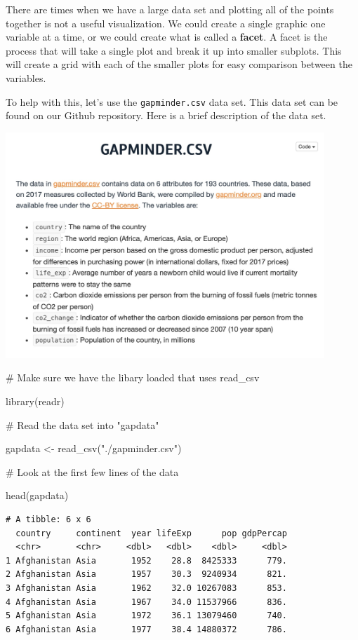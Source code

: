 \documentclass[
  letterpaper,
  DIV=11,
  numbers=noendperiod]{scrreprt}
\newenvironment{Shaded}{\begin{snugshade}}{\end{snugshade}}
\newcommand{\CommentTok}[1]{\textcolor[rgb]{0.37,0.37,0.37}{#1}}
\newcommand{\FunctionTok}[1]{\textcolor[rgb]{0.28,0.35,0.67}{#1}}
\newcommand{\NormalTok}[1]{\textcolor[rgb]{0.00,0.23,0.31}{#1}}
\newcommand{\OtherTok}[1]{\textcolor[rgb]{0.00,0.23,0.31}{#1}}
\newcommand{\StringTok}[1]{\textcolor[rgb]{0.13,0.47,0.30}{#1}}
\begin{document}
There are times when we have a large data set and plotting all of the
points together is not a useful visualization. We could create a single
graphic one variable at a time, or we could create what is called a
\textbf{facet}. A facet is the process that will take a single plot and
break it up into smaller subplots. This will create a grid with each of
the smaller plots for easy comparison between the variables.

To help with this, let's use the \texttt{gapminder.csv} data set. This
data set can be found on our Github repository. Here is a brief
description of the data set.

\includegraphics[width=0.9\textwidth,height=\textheight]{./images/AST_3.jpg}

\begin{Shaded}
\begin{Highlighting}[]
\CommentTok{\# Make sure we have the libary loaded that uses read\_csv}

\FunctionTok{library}\NormalTok{(readr)}

\CommentTok{\# Read the data set into "gapdata"}

\NormalTok{gapdata }\OtherTok{\textless{}{-}} \FunctionTok{read\_csv}\NormalTok{(}\StringTok{"./gapminder.csv"}\NormalTok{)}

\CommentTok{\# Look at the first few lines of the data}

\FunctionTok{head}\NormalTok{(gapdata)}
\end{Highlighting}
\end{Shaded}

\begin{verbatim}
# A tibble: 6 x 6
  country     continent  year lifeExp      pop gdpPercap
  <chr>       <chr>     <dbl>   <dbl>    <dbl>     <dbl>
1 Afghanistan Asia       1952    28.8  8425333      779.
2 Afghanistan Asia       1957    30.3  9240934      821.
3 Afghanistan Asia       1962    32.0 10267083      853.
4 Afghanistan Asia       1967    34.0 11537966      836.
5 Afghanistan Asia       1972    36.1 13079460      740.
6 Afghanistan Asia       1977    38.4 14880372      786.
\end{verbatim}
\end{document}

